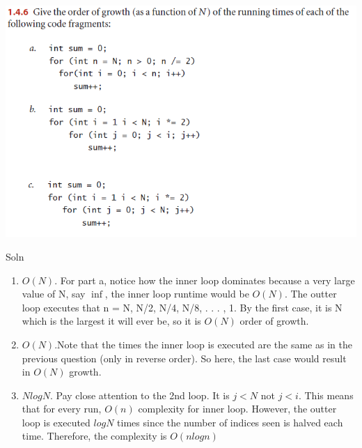 \documentclass[11pt,fleqn]{article}
\begin{document}
\begin{center}
	\includegraphics[scale = 1]{1.4.6.png}
	\end{center}
	
Soln

\begin{enumerate}
	\item $O(N)$. For part a, notice how the inner loop dominates because a very large value of N, say $\inf$, the inner loop runtime would be $O(N)$. The outter loop executes that n = N, N/2, N/4, N/8, . . . , 1. By the first case, it is N which is the largest it will ever be, so it is $O(N)$ order of growth.
	
	\item $O(N)$.Note that the times the inner loop is executed are the same as in the previous question
(only in reverse order). So here, the last case would result in $O(N)$ growth.

	\item $NlogN$. Pay close attention to the 2nd loop. It is $j<N$ not $j<i$. This means that for every run, $O(n)$ complexity for inner loop. However, the outter loop is executed $log N$ times since the number of indices seen is halved each time. Therefore, the complexity is $O(nlogn)$
\end{enumerate}
\end{document}

